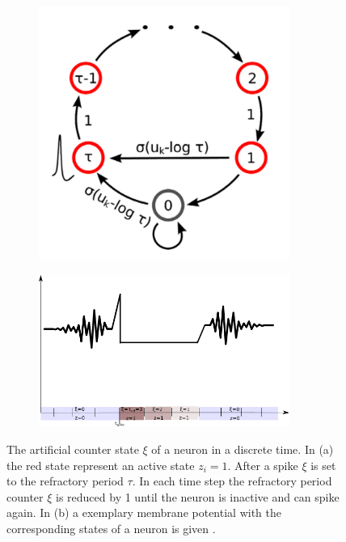 \begin{figure}
	\centering
	\begin{subfigure}[t]{.39\textwidth}
  		\centering
  		\includegraphics[width=0.9\textwidth]{imgs/snn_sample2.png}
  		\caption{}
  		\label{fig:snnsamp2sub1}
	\end{subfigure}
	\begin{subfigure}[t]{.59\textwidth}
  		\centering
  		\includegraphics[width=0.9\textwidth]{imgs/sampl_bsp.png}
  		\caption{}
  		\label{fig:snnsamp2sub1}
	\end{subfigure}
    \caption[The artificial counter state of a neuron in a discrete time.]{The artificial counter state $\xi$ of a neuron in a discrete time. In (a) the red state represent an active state $z_i = 1$. After a spike $\xi$ is set to the refractory period $\tau$. In each time step the refractory period counter $\xi$ is reduced by 1 until the neuron is inactive and can spike again. In (b) a exemplary membrane potential with the corresponding states of a neuron is given \cite{Buesing2011}.}
	\label{fig:snnsamp2}
\end{figure}




